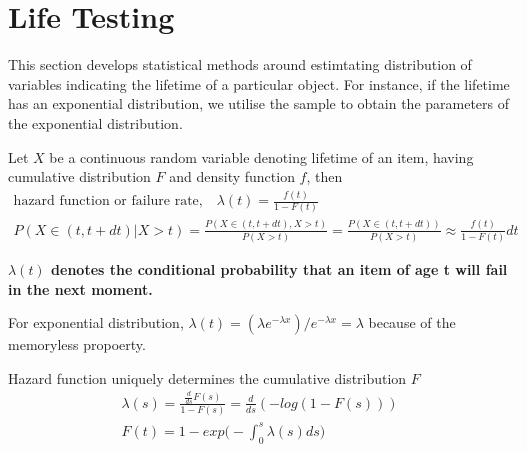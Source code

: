 \documentclass[../probability-notes.tex]{subfiles}
\begin{document}
    \chapter{Life Testing}\label{sec:life_testing}
    This section develops statistical methods around estimtating distribution of variables indicating the lifetime of a particular object. For instance, if the lifetime has an exponential distribution, we utilise the sample to obtain the parameters of the exponential distribution.\newline

    Let $X$ be a continuous random variable denoting lifetime of an item, having cumulative distribution $F$ and density function $f$, then
    \begin{gather*}
        \text{hazard function or failure rate,} \quad \lambda(t) = \frac{f(t)}{1 - F(t)}\\
        P(X \in (t, t+dt)|X > t) = \frac{P(X \in (t, t+dt), X > t)}{P(X > t)} = \frac{P(X \in (t, t+dt))}{P(X > t)} \approx \frac{f(t)}{1 - F(t)} dt
    \end{gather*}

    \textbf{$\lambda(t)$ denotes the conditional probability that an item of age t will fail in the next moment.}\newline

    For exponential distribution, $\lambda(t) = (\lambda e^{-\lambda x})/e^{-\lambda x} = \lambda$ because of the memoryless propoerty.\newline

    Hazard function uniquely determines the cumulative distribution $F$
    \begin{gather*}
        \lambda(s) = \frac{\frac{d}{ds} F(s)}{1 - F(s)} = \frac{d}{ds} (-log(1 - F(s)))\\
        F(t) = 1 - exp\big(-\int_{0}^{s} \lambda(s) ds \big)
    \end{gather*}

\end{document}
